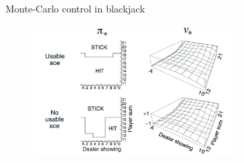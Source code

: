 \bgroup
\begin{frame}{Monte-Carlo control in blackjack}
\begin{figure}
\centering
\includegraphics[width=0.7\textwidth]{img/blackjack_mc_control.pdf}
\end{figure}
\end{frame}
\egroup